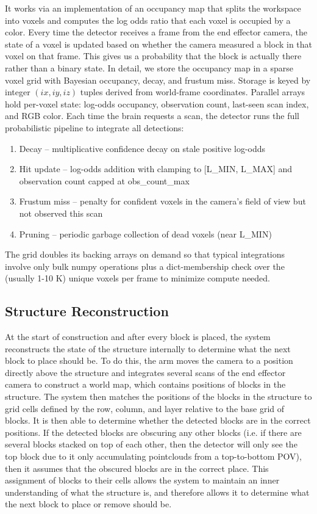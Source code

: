 \noindent It works via an implementation of an occupancy map that splits the workspace into voxels and computes the log odds ratio that each voxel is occupied by a color. Every time the detector receives a frame from the end effector camera, the state of a voxel is updated based on whether the camera measured a block in that voxel on that frame. This gives us a probability that the block is actually there rather than a binary state. In detail, we store the occupancy map in a sparse voxel grid with Bayesian occupancy, decay, and frustum miss. Storage is keyed by integer $(ix, iy, iz)$ tuples derived from world-frame coordinates. Parallel arrays hold per-voxel state: log-odds occupancy, observation count, last-seen scan index, and RGB color. Each time the brain requests a scan, the detector runs the full probabilistic pipeline to integrate all detections:
\begin{enumerate}
    \item Decay -- multiplicative confidence decay on stale positive log-odds
    \item Hit update -- log-odds addition with clamping to [L\_MIN, L\_MAX] and observation count capped at obs\_count\_max
    \item Frustum miss -- penalty for confident voxels in the camera's field of view but not observed this scan
    \item Pruning -- periodic garbage collection of dead voxels (near L\_MIN)
\end{enumerate}
The grid doubles its backing arrays on demand so that typical integrations involve only bulk numpy operations plus a dict-membership check over the (usually 1-10 K) unique voxels per frame to minimize compute needed. 



\subsection{Structure Reconstruction}

At the start of construction and after every block is placed, the system reconstructs the state of the structure internally to determine what the next block to place should be. To do this, the arm moves the camera to a position directly above the structure and integrates several scans of the end effector camera to construct a world map, which contains positions of blocks in the structure. The system then matches the positions of the blocks in the structure to grid cells defined by the row, column, and layer relative to the base grid of blocks. It is then able to determine whether the detected blocks are in the correct positions. If the detected blocks are obscuring any other blocks (i.e. if there are several blocks stacked on top of each other, then the detector will only see the top block due to it only accumulating pointclouds from a top-to-bottom POV), then it assumes that the obscured blocks are in the correct place. This assignment of blocks to their cells allows the system to maintain an inner understanding of what the structure is, and therefore allows it to determine what the next block to place or remove should be.


